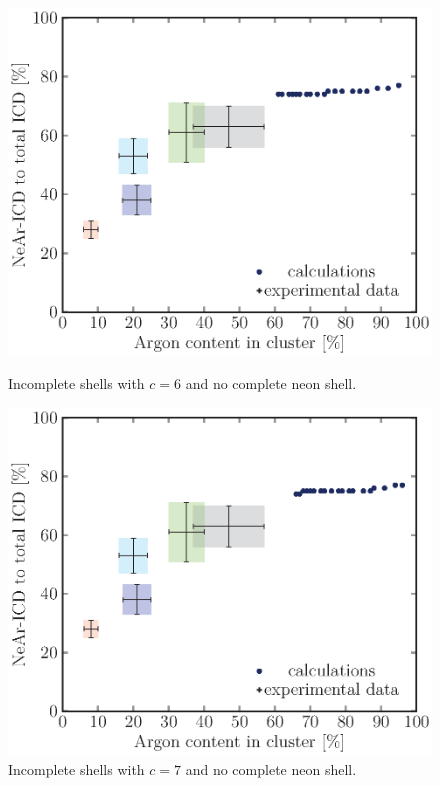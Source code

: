 \begin{figure}[!h]
\begin{minipage}{0.48\textwidth}
    \centering
    \includegraphics[scale=0.5]{pics/incompl00_06.ps}
    \caption{Incomplete shells with $c=6$ and no complete neon shell.}
    \label{incompl00_06}
\end{minipage}
\hfill
\begin{minipage}{0.48\textwidth}
    \centering
    \includegraphics[scale=0.5]{pics/incompl00_07.ps}
    \caption{Incomplete shells with $c=7$ and no complete neon shell.}
    \label{incompl00_07}
\end{minipage}
\end{figure}

